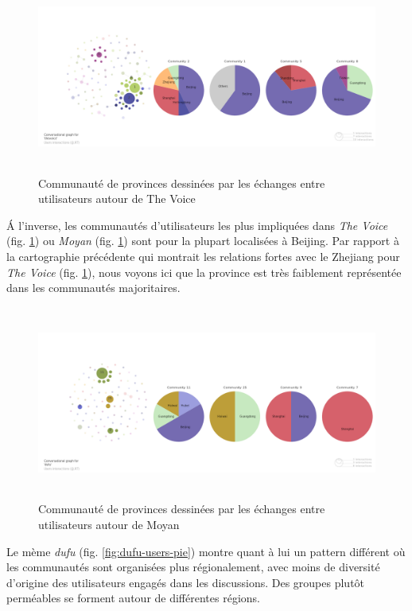 \begin{figure}[h!]
    \centering
    \includegraphics[width=5.9996in,height=2.5004in]{figures/chap4/chapitre4-img56.png}
    \caption{
        Communauté de provinces dessinées par les échanges entre utilisateurs autour de The Voice
    }
    \label{fig:voice-users-pie}
\end{figure}

\'A l{\textquoteright}inverse, les communautés d{\textquoteright}utilisateurs les plus impliquées dans \textit{The Voice} (fig. \ref{fig:voice-users-pie}) ou \textit{Moyan} (fig. \ref{fig:voice-users-pie}) sont pour la plupart localisées \`a Beijing. Par rapport \`a la cartographie précédente qui montrait les relations fortes avec le Zhejiang pour \textit{The Voice} (fig. \ref{fig:voice-users-pie}), nous voyons ici que la province est très faiblement représentée dans les communautés majoritaires. 

\begin{figure}[h!]
  \centering
   \includegraphics[width=5.9996in,height=2.5004in]{figures/chap4/chapitre4-img57.png}
    \caption{
        Communauté de provinces dessinées par les échanges entre utilisateurs autour de Moyan
    }
    \label{fig:moyan-users-pie}
\end{figure}

Le mème \textit{dufu} (fig. \ref{fig:dufu-users-pie}) montre quant \`a lui un pattern différent o\`u les communautés sont organisées plus régionalement, avec moins de diversité d{\textquoteright}origine des utilisateurs engagés dans les discussions. Des groupes plutôt perméables se forment autour de différentes régions.


